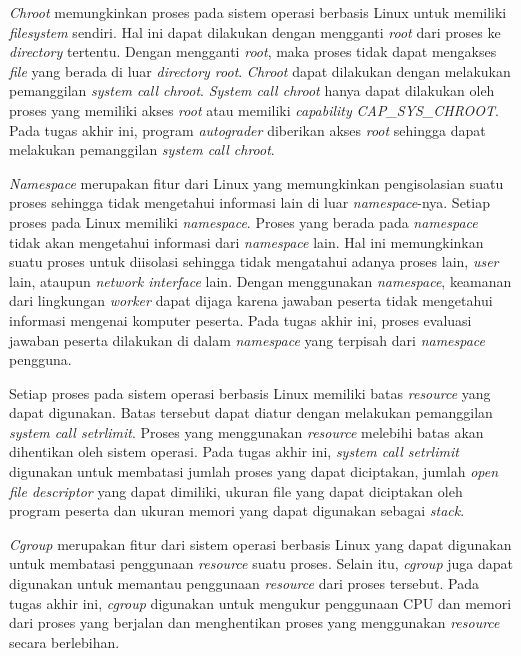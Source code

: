 \par \textit{Chroot} memungkinkan proses pada sistem operasi berbasis Linux untuk memiliki \textit{filesystem} sendiri. Hal ini dapat dilakukan dengan mengganti \textit{root} dari proses ke \textit{directory} tertentu. Dengan mengganti \textit{root}, maka proses tidak dapat mengakses \textit{file} yang berada di luar \textit{directory root}. \textit{Chroot} dapat dilakukan dengan melakukan pemanggilan \textit{system call chroot}. \textit{System call chroot} hanya dapat dilakukan oleh proses yang memiliki akses \textit{root} atau memiliki \textit{capability} \textit{CAP\_SYS\_CHROOT}. Pada tugas akhir ini, program \textit{autograder} diberikan akses \textit{root} sehingga dapat melakukan pemanggilan \textit{system call chroot}.

\par \textit{Namespace} merupakan fitur dari Linux yang memungkinkan pengisolasian suatu proses sehingga tidak mengetahui informasi lain di luar \textit{namespace}-nya. Setiap proses pada Linux memiliki \textit{namespace}. Proses yang berada pada \textit{namespace} tidak akan mengetahui informasi dari \textit{namespace} lain. Hal ini memungkinkan suatu proses untuk diisolasi sehingga tidak mengatahui adanya proses lain, \textit{user} lain, ataupun \textit{network interface} lain. Dengan menggunakan \textit{namespace}, keamanan dari lingkungan \textit{worker} dapat dijaga karena jawaban peserta tidak mengetahui informasi mengenai komputer peserta. Pada tugas akhir ini, proses evaluasi jawaban peserta dilakukan di dalam \textit{namespace} yang terpisah dari \textit{namespace} pengguna.

\par Setiap proses pada sistem operasi berbasis Linux memiliki batas \textit{resource} yang dapat digunakan. Batas tersebut dapat diatur dengan melakukan pemanggilan \textit{system call setrlimit}. Proses yang menggunakan \textit{resource} melebihi batas akan dihentikan oleh sistem operasi. Pada tugas akhir ini, \textit{system call setrlimit} digunakan untuk membatasi jumlah proses yang dapat diciptakan, jumlah \textit{open file descriptor} yang dapat dimiliki, ukuran file yang dapat diciptakan oleh program peserta dan ukuran memori yang dapat digunakan sebagai \textit{stack}.

\par \textit{Cgroup} merupakan fitur dari sistem operasi berbasis Linux yang dapat digunakan untuk membatasi penggunaan \textit{resource} suatu proses. Selain itu, \textit{cgroup} juga dapat digunakan untuk memantau penggunaan \textit{resource} dari proses tersebut. Pada tugas akhir ini, \textit{cgroup} digunakan untuk mengukur penggunaan CPU dan memori dari proses yang berjalan dan menghentikan proses yang menggunakan \textit{resource} secara berlebihan.

